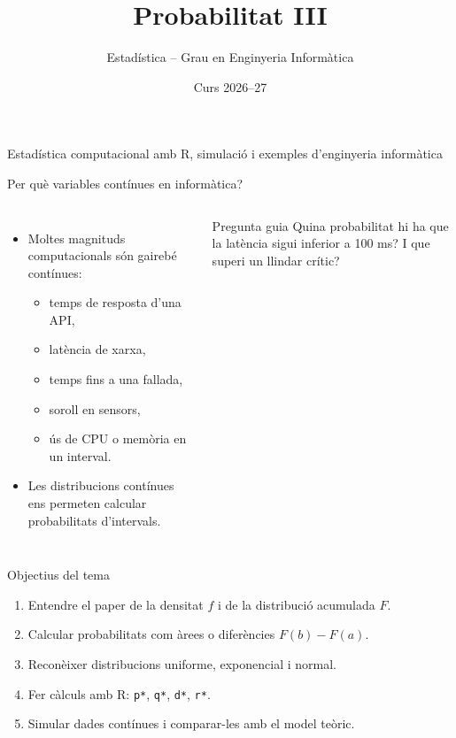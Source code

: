 \documentclass[10pt,aspectratio=169]{beamer}
\title[Probabilitat III]{Probabilitat III}
\author{Estadística -- Grau en Enginyeria Informàtica}
\date{Curs 2026--27}
\newcommand{\R}{\textsf{R}}
\begin{document}
\begin{frame}[plain]
  \titlepage
  \vspace{-0.45cm}
  \begin{center}
  \small\textcolor{DeepBlue}{Estadística computacional amb \R, simulació i exemples d'enginyeria informàtica}
  \end{center}
\end{frame}


\begin{frame}[fragile]{Per què variables contínues en informàtica?}
\begin{columns}[T]
\begin{itemize}
  \item Moltes magnituds computacionals són gairebé contínues:
  \begin{itemize}
    \item temps de resposta d'una API,
    \item latència de xarxa,
    \item temps fins a una fallada,
    \item soroll en sensors,
    \item ús de CPU o memòria en un interval.
  \end{itemize}
  \item Les distribucions contínues ens permeten calcular probabilitats d'intervals.
\end{itemize}
\begin{block}{Pregunta guia}
Quina probabilitat hi ha que la latència sigui inferior a 100 ms? I que superi un llindar crític?
\end{block}
\end{columns}
\end{frame}

\begin{frame}[fragile]{Objectius del tema}
\begin{enumerate}
  \item Entendre el paper de la densitat $f$ i de la distribució acumulada $F$.
  \item Calcular probabilitats com àrees o diferències $F(b)-F(a)$.
  \item Reconèixer distribucions uniforme, exponencial i normal.
  \item Fer càlculs amb \R: \texttt{p*}, \texttt{q*}, \texttt{d*}, \texttt{r*}.
  \item Simular dades contínues i comparar-les amb el model teòric.
\end{enumerate}
\end{frame}
\end{document}
